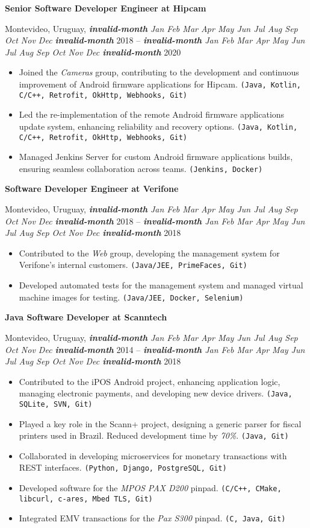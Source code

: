 \documentclass[a4paper]{article}
\newcommand{\invalidmonth}{\emph{\textbf{invalid-month}}}
\newcommand{\cvmonth}[1]{
  \ifcase#1 \invalidmonth
    \or Jan
    \or Feb
    \or Mar
    \or Apr
    \or May
    \or Jun
    \or Jul
    \or Aug
    \or Sep
    \or Oct
    \or Nov
    \or Dec
  \else
    \invalidmonth
  \fi
}
\newcommand{\cvdate}[2]{
  \emph{\cvmonth{#1}} {#2}
}
\newcommand{\cvposition}[2]{
  \noindent\textbf{#1 at #2}\par
}
\newcommand{\cvlocation}[3]{
  \noindent #1, #2 -- #3\par
}
\newenvironment{cvexperience}{
  \noindent{\large\textbf{Work Experience:}}
  \medskip
}{
  \bigskip
}
\newenvironment{cvjob}{
  \begin{sloppypar}
}{
  \end{sloppypar}
  \bigskip
}
\newcommand{\cvskills}[1]{\texttt{(#1)}}
\begin{document}
\begin{cvexperience}
\begin{cvjob}
  \cvposition{Senior Software Developer Engineer}{Hipcam}
  \cvlocation{Montevideo, Uruguay}{\cvdate{11}{2018}}{\cvdate{10}{2020}}
  \begin{itemize}
    \item Joined the \emph{Cameras} group, contributing to the development and continuous improvement of Android firmware
    applications for Hipcam. \cvskills{Java, Kotlin, C/C++, Retrofit, OkHttp, Webhooks, Git}
    \item Led the re-implementation of the remote Android firmware applications update system, enhancing reliability and recovery options. 
    \cvskills{Java, Kotlin, C/C++, Retrofit, OkHttp, Webhooks, Git}
    \item Managed Jenkins Server for custom Android firmware applications builds, ensuring seamless collaboration across teams. 
    \cvskills{Jenkins, Docker}
  \end{itemize}
\end{cvjob}

\begin{cvjob}
  \cvposition{Software Developer Engineer}{Verifone}
  \cvlocation{Montevideo, Uruguay}{\cvdate{5}{2018}}{\cvdate{11}{2018}}
  \begin{itemize}
    \item Contributed to the \emph{Web} group, developing the management system for Verifone's internal customers. \cvskills{Java/JEE, PrimeFaces, Git}
    \item Developed automated tests for the management system and managed virtual machine images for testing. \cvskills{Java/JEE, Docker, Selenium}
  \end{itemize}
\end{cvjob}


\begin{cvjob}
  \cvposition{Java Software Developer}{Scanntech}
  \cvlocation{Montevideo, Uruguay}{\cvdate{8}{2014}}{\cvdate{4}{2018}}
  \begin{itemize}
    \item Contributed to the iPOS Android project, enhancing application logic, managing electronic payments, 
    and developing new device drivers. \cvskills{Java, SQLite, SVN, Git}
    \item Played a key role in the Scann+ project, designing a generic parser for fiscal printers used in Brazil. 
    Reduced development time by \emph{70\%}. \cvskills{Java, Git}
    \item Collaborated in developing microservices for monetary transactions with REST interfaces. 
    \cvskills{Python, Django, PostgreSQL, Git}
    \item Developed software for the \emph{MPOS PAX D200} pinpad. \cvskills{C/C++, CMake, libcurl, c-ares, Mbed TLS, Git}
    \item Integrated EMV transactions for the \emph{Pax S300} pinpad. \cvskills{C, Java, Git}
  \end{itemize}
\end{cvjob}


\end{cvexperience}
\end{document}
